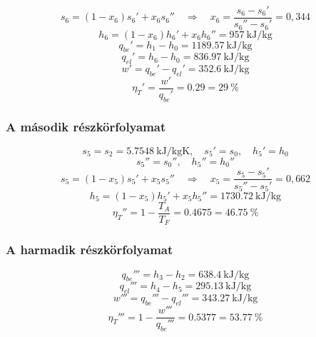 \begin{equation*}
   s_6=\left (1-x_6 \right) s_6' + x_6 s_6''
   \quad
   \Rightarrow
   \quad
   x_6=\dfrac{s_6 - s_6'} {s_6'' - s_6'}=0,344
\end{equation*}
  \begin{equation*}
	h_6=\left (1-x_6 \right)h_6'+x_6 h_6''=\SI{957}{\kilo\joule\per\kilogram}
\end{equation*}
  \begin{equation*}
	q_{be}'=h_1-h_0=\SI{1189.57}{\kilo\joule\per\kilogram}
\end{equation*}
  \begin{equation*}
	q_{el}'=h_6-h_0=\SI{836.97}{\kilo\joule\per\kilogram}
\end{equation*}
  \begin{equation*}
	w'=q_{be}'-q_{el}'=\SI{352.6}{\kilo\joule\per\kilogram}
\end{equation*}
  \begin{equation*}
	\eta_T'=\dfrac{w'}{q_{be}'}=\SI{0.29}
    =
	\SI{29}{\%}
\end{equation*}
 \subsubsection{A második részkörfolyamat}
  \begin{equation*}
  	s_5=s_2=\SI{5.7548}{\kilo\joule\per\kilogram\kelvin},
 	\quad
 	s_5'=s_0,
 	\quad
 	h_5'=h_0	
 \end{equation*}
  \begin{equation*}
 	s_5''=s_0'',
 	\quad
 	h_5''=h_0''	
 \end{equation*}
\begin{equation*}
s_5=\left (1-x_5 \right) s_5' + x_5 s_5''
\quad
\Rightarrow
\quad
x_5=\dfrac{s_5 - s_5'} {s_5'' - s_5'}=0,662
\end{equation*}
 \begin{equation*}
	h_5=\left (1-x_5 \right)h_5'+x_5 h_5''=\SI{1730.72}{\kilo\joule\per\kilogram}
\end{equation*}
   \begin{equation*}
 	\eta_T''=1-\dfrac{T_A}{T_F}=\SI{0.4675}
    =
 	\SI{46.75}{\%}
 \end{equation*}
 \subsubsection{A harmadik részkörfolyamat}
   \begin{equation*}
 	q_{be}'''=h_3-h_2=\SI{638.4}{\kilo\joule\per\kilogram}
 \end{equation*}
   \begin{equation*}
	q_{el}'''=h_4-h_5=\SI{295.13}{\kilo\joule\per\kilogram}
\end{equation*}
  \begin{equation*}
	w'''=q_{be}'''-q_{el}'''=\SI{343.27}{\kilo\joule\per\kilogram}
\end{equation*}
   \begin{equation*}
	\eta_T'''=1-\dfrac{w'''}{q_{be}'''}=\SI{0.5377}
	=
	\SI{53.77}{\%}
\end{equation*}
